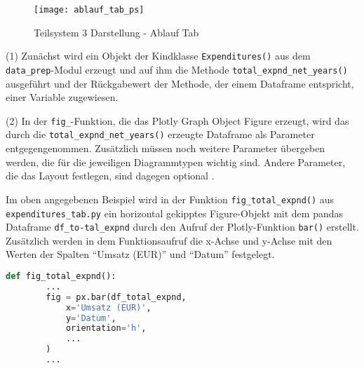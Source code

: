     
    \begin{figure}[H]
        \centering
            \texttt{[image: ablauf\_tab\_ps]}
            \caption{Teilsystem 3 Darstellung - Ablauf Tab}
            \label{fig:process tab}
    \end{figure}

    (1) Zunächst wird ein Objekt der Kindklasse \texttt{Expenditures()} aus dem \texttt{data\_prep}-Modul erzeugt 
    und auf ihm die Methode \texttt{total\_expnd\_net\_years()} ausgeführt und der Rückgabewert der Methode, der einem Dataframe entspricht, einer
    Variable zugewiesen.



    (2) In der \texttt{fig\_}-Funktion, die das Plotly Graph Object Figure erzeugt, wird das durch die \texttt{total\_expnd\_net\_years()} erzeugte Dataframe
    als Parameter entgegengenommen. Zusätzlich müssen noch weitere Parameter übergeben werden, die für die jeweiligen Diagrammtypen wichtig sind.
    Andere Parameter, die das Layout festlegen, sind dagegen optional \cite[vgl.][]{plotly_plotlygraph_objectsbar_2021}.
    
    Im oben angegebenen Beispiel wird in der Funktion \texttt{fig\_total\_expnd()} aus \texttt{expenditures\_tab.py} ein horizontal gekipptes Figure-Objekt
    mit dem pandas Dataframe \texttt{df\_to-tal\_expnd} durch den Aufruf der Plotly-Funktion \texttt{bar()} erstellt. 
    Zusätzlich werden in dem Funktionsaufruf die x-Achse und y-Achse mit den Werten der Spalten \enquote{Umsatz (EUR)} und \enquote{Datum} festgelegt. 

    \begin{lstlisting}[language=Python, caption=Teilsystem 3 Darstellung - fig\_total\_expnd() Auszug 1]
    def fig_total_expnd():
        ...
        fig = px.bar(df_total_expnd,
            x='Umsatz (EUR)',
            y='Datum',
            orientation='h',
            ...
        )
        ...
    \end{lstlisting}
    
